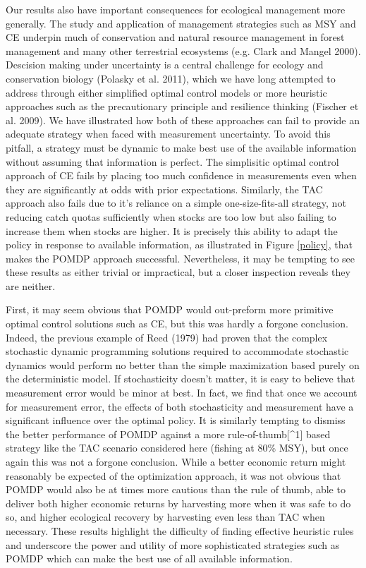 \documentclass[3p]{elsarticle} %
\begin{document}
Our results also have important consequences for ecological management
more generally. The study and application of management strategies such
as MSY and CE underpin much of conservation and natural resource
management in forest management and many other terrestrial ecosystems
(e.g. Clark and Mangel 2000). Descision making under uncertainty is a
central challenge for ecology and conservation biology (Polasky et al.
2011), which we have long attempted to address through either simplified
optimal control models or more heuristic approaches such as the
precautionary principle and resilience thinking (Fischer et al. 2009).
We have illustrated how both of these approaches can fail to provide an
adequate strategy when faced with measurement uncertainty. To avoid this
pitfall, a strategy must be dynamic to make best use of the available
information without assuming that information is perfect. The
simplisitic optimal control approach of CE fails by placing too much
confidence in measurements even when they are significantly at odds with
prior expectations. Similarly, the TAC approach also fails due to it's
reliance on a simple one-size-fits-all strategy, not reducing catch
quotas sufficiently when stocks are too low but also failing to increase
them when stocks are higher. It is precisely this ability to adapt the
policy in response to available information, as illustrated in Figure
\ref{policy}, that makes the POMDP approach successful. Nevertheless, it
may be tempting to see these results as either trivial or impractical,
but a closer inspection reveals they are neither.

First, it may seem obvious that POMDP would out-preform more primitive
optimal control solutions such as CE, but this was hardly a forgone
conclusion. Indeed, the previous example of Reed (1979) had proven that
the complex stochastic dynamic programming solutions required to
accommodate stochastic dynamics would perform no better than the simple
maximization based purely on the deterministic model. If stochasticity
doesn't matter, it is easy to believe that measurement error would be
minor at best. In fact, we find that once we account for measurement
error, the effects of both stochasticity and measurement have a
significant influence over the optimal policy. It is similarly tempting
to dismiss the better performance of POMDP against a more
rule-of-thumb{[}\^{}1{]} based strategy like the TAC scenario considered
here (fishing at 80\% MSY), but once again this was not a forgone
conclusion. While a better economic return might reasonably be expected
of the optimization approach, it was not obvious that POMDP would also
be at times more cautious than the rule of thumb, able to deliver both
higher economic returns by harvesting more when it was safe to do so,
and higher ecological recovery by harvesting even less than TAC when
necessary. These results highlight the difficulty of finding effective
heuristic rules and underscore the power and utility of more
sophisticated strategies such as POMDP which can make the best use of
all available information.
\end{document}
